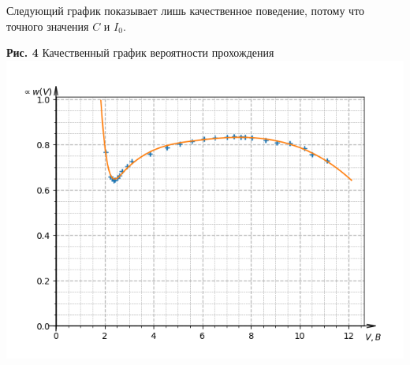 \documentclass[a4paper, 12pt]{article}%
\begin{document}
	Следующий график показывает лишь качественное поведение, потому что точного значения $C$ и $I_0$. 
	\newpage
	\begin{center}
		\textbf{Рис. 4} Качественный график вероятности прохождения\\
		\includegraphics[width=\linewidth]{w.png}
	\end{center}
\end{document}
